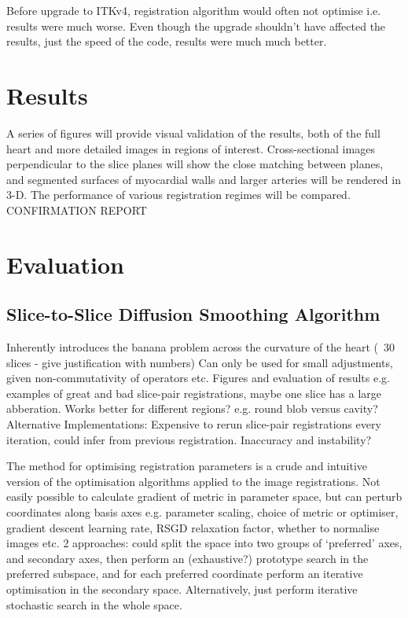       Before upgrade to ITKv4, registration algorithm would often not optimise i.e. results were much worse. Even though the upgrade shouldn't have affected the results, just the speed of the code, results were much much better.
   
\section{Results}
  A series of figures will provide visual validation of the results, both of the full heart and more detailed images in regions of interest. Cross-sectional images perpendicular to the slice planes will show the close matching between planes, and segmented surfaces of myocardial walls and larger arteries will be rendered in 3-D. The performance of various registration regimes will be compared.
CONFIRMATION REPORT

\section{Evaluation} %
\label{sec:evaluation}
  \subsection{Slice-to-Slice Diffusion Smoothing Algorithm}
    Inherently introduces the banana problem across the curvature of the heart (~30 slices - give justification with numbers)
    Can only be used for small adjustments, given non-commutativity of operators etc.
    Figures and evaluation of results e.g. examples of great and bad slice-pair registrations, maybe one slice has a large abberation. Works better for different regions? e.g. round blob versus cavity?
    Alternative Implementations: Expensive to rerun slice-pair registrations every iteration, could infer from previous registration. Inaccuracy and instability?
    
    The method for optimising registration parameters is a crude and intuitive version of the optimisation algorithms applied to the image registrations. Not easily possible to calculate gradient of metric in parameter space, but can perturb coordinates along basis axes e.g. parameter scaling, choice of metric or optimiser, gradient descent learning rate, RSGD relaxation factor, whether to normalise images etc. 2 approaches: could split the space into two groups of `preferred' axes, and secondary axes, then perform an (exhaustive?) prototype search in the preferred subspace, and for each preferred coordinate perform an iterative optimisation in the secondary space. Alternatively, just perform iterative stochastic search in the whole space.
    
